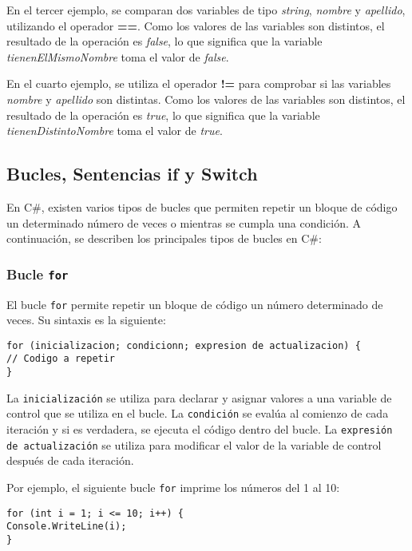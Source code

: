 \documentclass[executivepaper]{article}
\begin{document}
En el tercer ejemplo, se comparan dos variables de tipo \textit{string}, \textit{nombre} y \textit{apellido}, utilizando el operador \textbf{==}. Como los valores de las variables son distintos, el resultado de la operación es \textit{false}, lo que significa que la variable \textit{tienenElMismoNombre} toma el valor de \textit{false}.

En el cuarto ejemplo, se utiliza el operador \textbf{!=} para comprobar si las variables \textit{nombre} y \textit{apellido} son distintas. Como los valores de las variables son distintos, el resultado de la operación es \textit{true}, lo que significa que la variable \textit{tienenDistintoNombre} toma el valor de \textit{true}.

\subsection{Bucles, Sentencias if y Switch}

En C\#, existen varios tipos de bucles que permiten repetir un bloque de código un determinado número de veces o mientras se cumpla una condición. A continuación, se describen los principales tipos de bucles en C\#:

\subsubsection*{Bucle \texttt{for}}

El bucle \verb|for| permite repetir un bloque de código un número determinado de veces. Su sintaxis es la siguiente:

\begin{lstlisting}
for (inicializacion; condicionn; expresion de actualizacion) {
// Codigo a repetir
}
\end{lstlisting}

La \texttt{inicialización} se utiliza para declarar y asignar valores a una variable de control que se utiliza en el bucle. La \texttt{condición} se evalúa al comienzo de cada iteración y si es verdadera, se ejecuta el código dentro del bucle. La \texttt{expresión de actualización} se utiliza para modificar el valor de la variable de control después de cada iteración.

Por ejemplo, el siguiente bucle \verb|for| imprime los números del 1 al 10:

\begin{lstlisting}
for (int i = 1; i <= 10; i++) {
Console.WriteLine(i);
}
\end{lstlisting}
\end{document}
